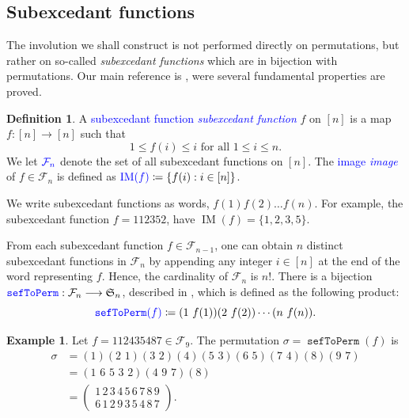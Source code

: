 \documentclass[reqno]{amsart}
\theoremstyle{definition}
\newtheorem{definition}[theorem]{Definition}
\newtheorem{example}[theorem]{Example}
\newcommand{\defin}[1]{%
\relax\ifmmode%
\textcolor{blue}{#1}%
\else\textcolor{blue}{\emph{#1}}%
\fi%
}
\newcommand{\symS}{\mathfrak{S}}
\newcommand{\SEF}{\mathcal{F}}  %
\DeclareMathOperator{\supp}{IM}
\DeclareMathOperator{\sefToPerm}{\mathtt{sefToPerm}}
\begin{document}
\subsection{Subexcedant functions}

The involution we shall construct is not performed directly on permutations,
but rather on so-called \emph{subexcedant functions} which are in bijection with permutations.
Our main reference is \cite{MantaciRakotondrajao2001},
were several fundamental properties are proved.
%
\begin{definition}\label{subex}
	A \defin{subexcedant function}  $f$ on $[n]$ is a map $f : [n] \longrightarrow [n]$
	such that
	\begin{equation*}
		1\leq f(i)\leq i \text{ for all } 1\leq i\leq n.
	\end{equation*}
	We let $\defin{\SEF_n}$ denote the set of all 
	subexcedant functions on $[n]$. 
	The \defin{image} of $f \in \SEF_n$ is defined as
	$\defin{\supp(f)} \coloneqq \{ f(i) : i \in [n] \}$.
\end{definition}
We write subexcedant functions as words, $f(1)f(2)\dotsc f(n)$.
For example, the subexcedant function $f=112352$, have $\supp(f)=\{1,2,3,5\}$.

From each subexcedant function $f \in \SEF_{n-1}$,
one can obtain $n$ distinct subexcedant functions in $\SEF_{n}$ by appending
any integer $i\in [n]$ at the end of the word representing $f$.
Hence, the cardinality of $\mathcal{F}_n$ is $n!$.
There is a bijection $\defin{\sefToPerm}: \SEF_n \longrightarrow \symS_n$,
described in \cite{MantaciRakotondrajao2001}, 
which is defined as the following product:
\begin{equation}\label{eq:sefToPerm}
  \defin{\sefToPerm(f)} \coloneqq (1\,\,f(1)) (2\,\,f(2)) \dotsm (n\,\,f(n)).
\end{equation}

\begin{example}\label{ex:sefToPerm}
Let $f = 112435487 \in \SEF_9$.
The permutation $\sigma=\sefToPerm(f)$ is
 \begin{align*}
 	\sigma &=(1)(2\,\,1)(3\,\,2)(4)(5\,\,3)(6\,\,5)(7\,\,4)(8)(9\,\,7)\\
 	&=(1\,\,6\,\,5\,\,3\,\,2)(4\,\,9\,\,7)(8)\\
 	&=\begin{pmatrix}
 	1\,2\,3\,4\,5\,6\,7\,8\,9 \\ 6\,1\,2\,9\,3\,5\,4\,8\,7
 	\end{pmatrix}.
 \end{align*}
\end{example}
\end{document}

